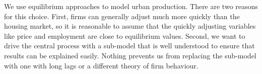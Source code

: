 
We use equilibrium approaches to model urban production. There are two reasons for this choice. First, firms can generally adjust much more quickly than the housing market, so it is reasonable to assume that the quickly adjusting variables like price and employment are close to equilibrium values.  Second, we want to drive the central process with a sub-model that is well understood to ensure that results can be explained easily. Nothing prevents us from replacing the sub-model with one with long lags or a different theory of firm behaviour. 









